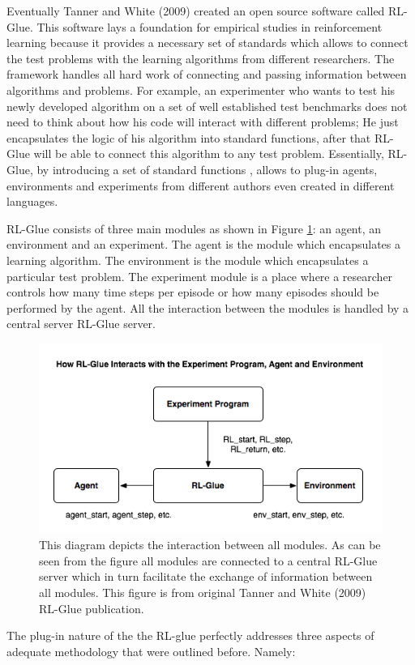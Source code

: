 {{Eventually Tanner and White (2009)\nocite{tanner2009rl} created an open source software called RL-Glue. This software lays a foundation for empirical studies in reinforcement learning because it provides a necessary set of standards which allows to connect the test problems with the learning algorithms from different researchers. The framework handles all hard work of connecting and passing information between algorithms and problems. For example, an experimenter who wants to test his newly developed algorithm on a set of well established test benchmarks does not need to think about how his code will interact with different problems; He just encapsulates the logic of his algorithm into standard functions, after that RL-Glue will be able to connect this algorithm to any test problem. Essentially, RL-Glue, by introducing a set of standard functions , allows to plug-in agents, environments and experiments from different authors even created in different languages.

RL-Glue consists of three main modules as shown in Figure \ref{fig:rlglue}: an agent, an environment and an experiment. The agent is the module which encapsulates a learning algorithm. The environment is the module which encapsulates a particular test problem. The experiment module is a place where a researcher controls how many time steps per episode or how many episodes should be performed by the agent. All the interaction between the modules is handled by a central server RL-Glue server.

\begin{figure}[ht]
\vskip 0.2in
\centering
\includegraphics[scale=0.9]{glue.png}
\caption{This diagram depicts the interaction between all modules. As can be seen from the figure all modules are connected to a central RL-Glue server which in turn facilitate the exchange of information between all modules. This figure is from original Tanner and White (2009) RL-Glue publication.}
\vskip -0.2in
\label{fig:rlglue}
\end{figure}
The plug-in nature of the the RL-glue perfectly addresses three aspects of adequate methodology that were outlined before. Namely:

}}

